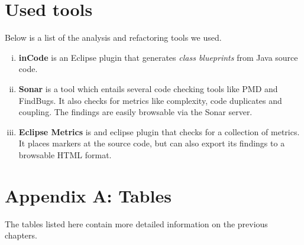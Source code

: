 \documentclass[a4paper, 10pt]{article}
\begin{document}

\newpage
\section{Used tools}
\label{sec:used_tools}

Below is a list of the analysis and refactoring tools we used.


\begin{enumerate}[i)]
\item \textbf{inCode} is an Eclipse plugin that generates \emph{class
    blueprints} from Java source code.
\item \textbf{Sonar}
	is a tool which entails several code checking tools like PMD and FindBugs. It also checks for metrics like complexity, code duplicates and coupling.
	The findings are easily browsable via the Sonar server.
\item \textbf{Eclipse Metrics} is and eclipse plugin 
	that checks for a collection of metrics.
	It places markers at the source code, but can also
	export its findings to a browsable HTML format.
\end{enumerate}



\section{Appendix A: Tables}
The tables listed here contain more detailed information on the
previous chapters.
\end{document}
